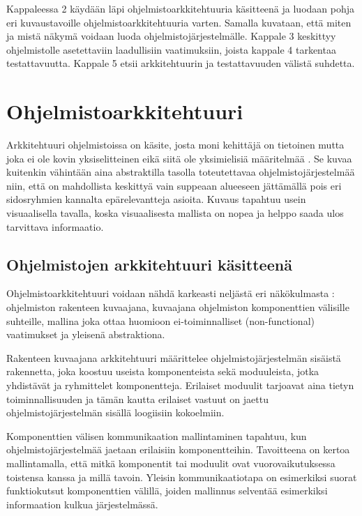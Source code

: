 \documentclass[finnish]{tktltiki2}
\theoremstyle{definition}
\theoremstyle{remark}
\begin{document}
Kappaleessa 2 käydään läpi ohjelmistoarkkitehtuuria käsitteenä ja luodaan pohja eri kuvaustavoille ohjelmistoarkkitehtuuria varten. Samalla kuvataan, että miten ja mistä näkymä voidaan luoda ohjelmistojärjestelmälle. Kappale 3 keskittyy ohjelmistolle asetettaviin laadullisiin vaatimuksiin, joista kappale 4 tarkentaa testattavuutta. Kappale 5 etsii arkkitehtuurin ja testattavuuden välistä suhdetta.


\section{Ohjelmistoarkkitehtuuri}
Arkkitehtuuri ohjelmistoissa on käsite, josta moni kehittäjä on tietoinen mutta joka ei ole kovin yksiselitteinen eikä siitä ole yksimielisiä määritelmää \citep[s. 363]{solms_what_2012}. 
Se kuvaa kuitenkin vähintään aina abstraktilla tasolla toteutettavaa ohjelmistojärjestelmää niin, että on mahdollista keskittyä vain suppeaan alueeseen jättämällä pois eri sidosryhmien kannalta epärelevantteja asioita. Kuvaus tapahtuu usein visuaalisella tavalla, koska visuaalisesta mallista on nopea ja helppo saada ulos tarvittava informaatio.   

\subsection{Ohjelmistojen arkkitehtuuri käsitteenä}
Ohjelmistoarkkitehtuuri voidaan nähdä karkeasti neljästä eri näkökulmasta  \citep[s. 2-7]{gorton_understanding_2011}:  ohjelmiston rakenteen kuvaajana, kuvaajana ohjelmiston komponenttien välisille suhteille, mallina joka ottaa huomioon ei-toiminnalliset (non-functional) vaatimukset ja yleisenä abstraktiona. 

Rakenteen kuvaajana arkkitehtuuri määrittelee ohjelmistojärjestelmän sisäistä rakennetta, joka koostuu useista komponenteista sekä moduuleista, jotka yhdistävät ja ryhmittelet komponentteja. Erilaiset moduulit tarjoavat aina tietyn toiminnallisuuden ja tämän kautta erilaiset vastuut on jaettu ohjelmistojärjestelmän sisällä loogiisiin kokoelmiin.

Komponenttien välisen kommunikaation mallintaminen tapahtuu, kun ohjelmistojärjestelmää jaetaan erilaisiin komponentteihin. Tavoitteena on kertoa mallintamalla, että mitkä komponentit tai moduulit ovat vuorovaikutuksessa toistensa kanssa ja millä tavoin. Yleisin kommunikaatiotapa on esimerkiksi suorat funktiokutsut komponenttien välillä, joiden mallinnus selventää esimerkiksi informaation kulkua järjestelmässä.  
\end{document}
